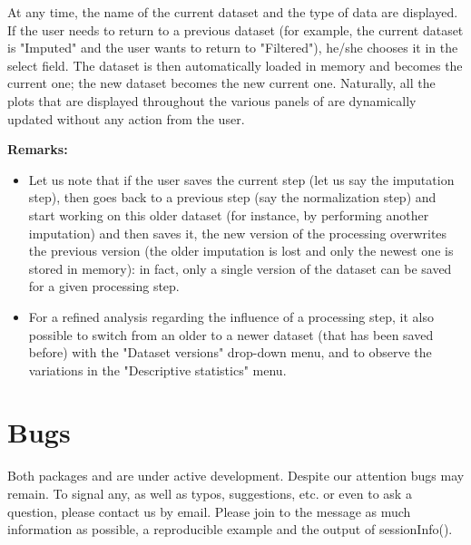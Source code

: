 \documentclass[12pt]{article}
\begin{document}
{{At any time, the name of the current dataset and the type of data are 
displayed. If the user needs to return to a previous dataset (for example, 
the current dataset is "Imputed" and the user wants to return to "Filtered"), 
he/she chooses it in the select field. The dataset is then automatically 
loaded in memory and becomes the current one; the new dataset becomes the new 
current one. Naturally, all the plots that are displayed throughout the 
various panels of  are dynamically updated without any 
action from the user.}


\textbf{Remarks:}
\begin{itemize}
\item Let us note that if the user saves the current step (let us say the 
imputation step), then goes back to a previous step (say the normalization 
step) and start working on this older dataset (for instance, by performing 
another imputation) and then saves it, the new version of the processing 
overwrites the previous version (the older imputation is lost and only the 
newest one is stored in memory): in fact, only a single version of the 
dataset can be saved for a given processing step.
\item For a refined analysis regarding the influence of a processing step, 
it also possible to switch from an older to a newer dataset (that has been 
saved before) with the "Dataset versions" drop-down menu, and to observe the 
variations in the "Descriptive statistics" menu.
\end{itemize}




\section{Bugs}\label{sec:sessionBugs}

Both packages  and  are under active 
development. Despite our attention bugs may remain. To signal any, as well 
as typos, suggestions, etc. or even to ask a question, please contact us by 
email. Please join to the message as much information as possible, a 
reproducible example and the output of sessionInfo(). 

}
\end{document}
